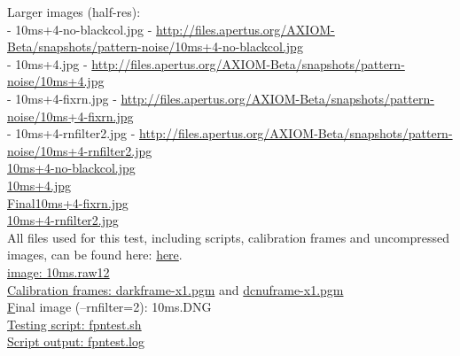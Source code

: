 {Larger images (half-res): \\

- 10ms+4-no-blackcol.jpg - \href{http://files.apertus.org/AXIOM-Beta/snapshots/pattern-noise/10ms+4-no-blackcol.jpg}{http://files.apertus.org/AXIOM-Beta/snapshots/pattern-noise/10ms+4-no-blackcol.jpg}\\
- 10ms+4.jpg - \href{http://files.apertus.org/AXIOM-Beta/snapshots/pattern-noise/10ms+4.jpg}{http://files.apertus.org/AXIOM-Beta/snapshots/pattern-noise/10ms+4.jpg}\\
- 10ms+4-fixrn.jpg - \href{http://files.apertus.org/AXIOM-Beta/snapshots/pattern-noise/10ms+4-fixrn.jpg}{http://files.apertus.org/AXIOM-Beta/snapshots/pattern-noise/10ms+4-fixrn.jpg}\\
- 10ms+4-rnfilter2.jpg - \href{http://files.apertus.org/AXIOM-Beta/snapshots/pattern-noise/10ms+4-rnfilter2.jpg}{http://files.apertus.org/AXIOM-Beta/snapshots/pattern-noise/10ms+4-rnfilter2.jpg} \\

\href{http://files.apertus.org/AXIOM-Beta/snapshots/pattern-noise/10ms+4-no-blackcol.jpg}{10ms+4-no-blackcol.jpg}\\
\href{http://files.apertus.org/AXIOM-Beta/snapshots/pattern-noise/10ms+4.jpg}{10ms+4.jpg}\\
\href{http://files.apertus.org/AXIOM-Beta/snapshots/pattern-noise/10ms+4-fixrn.jpg}{Final10ms+4-fixrn.jpg}\\
\href{http://files.apertus.org/AXIOM-Beta/snapshots/pattern-noise/10ms+4-rnfilter2.jpg}{10ms+4-rnfilter2.jpg}\\

All files used for this test, including scripts, calibration frames and uncompressed images, can be found here: \href{http://files.apertus.org/AXIOM-Beta/snapshots/pattern-noise/}{here}.\\

\href{http://files.apertus.org/AXIOM-Beta/snapshots/pattern-noise/10ms.raw12Raw12}{image: 10ms.raw12}\\
\href{http://files.apertus.org/AXIOM-Beta/snapshots/pattern-noise/darkframe-x1.pgm}{Calibration frames: darkframe-x1.pgm} and \href{http://files.apertus.org/AXIOM-Beta/snapshots/pattern-noise/dcnuframe-x1.pgm}{dcnuframe-x1.pgm}\\
\href{http://files.apertus.org/AXIOM-Beta/snapshots/pattern-noise/10ms.DNG}Final image (--rnfilter=2): {10ms.DNG}\\
\href{http://files.apertus.org/AXIOM-Beta/snapshots/pattern-noise/fpntest.sh}{Testing script: fpntest.sh}\\
\href{http://files.apertus.org/AXIOM-Beta/snapshots/pattern-noise/fpntest.log}{Script output: fpntest.log}\\






}
